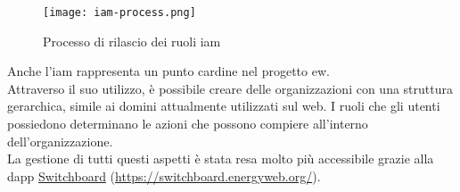 \begin{figure}[ht]
    \texttt{[image: iam-process.png]}
    \centering
    \caption{Processo di rilascio dei ruoli \gls{iam} \cite{img:iam}}
    \label{lab:iam-process}
\end{figure}

Anche l'\gls{iam} rappresenta un punto cardine nel progetto \gls{ew}. \\
Attraverso il suo utilizzo, è possibile creare delle organizzazioni con una struttura gerarchica, simile ai domini attualmente utilizzati sul web.
I ruoli che gli utenti possiedono determinano le azioni che possono compiere all'interno dell'organizzazione. \\
La gestione di tutti questi aspetti è stata resa molto più accessibile grazie alla \gls{dapp} \href{https://switchboard.energyweb.org/}{Switchboard} (\url{https://switchboard.energyweb.org/}).